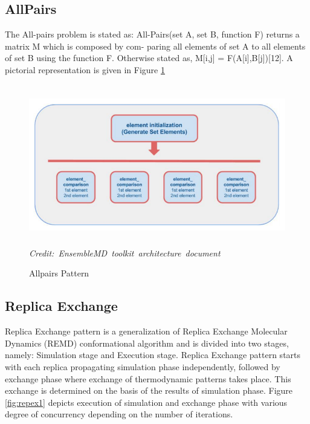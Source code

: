 \documentclass[10pt]{ruthesis}
\begin{document}
\subsection{AllPairs}
The All-pairs problem is stated as:
All-Pairs(set A, set B, function F) returns a matrix M which is composed by com-
paring all elements of set A to all elements of set B using the function F. Otherwise
stated as, M[i,j] = F(A[i],B[j])[12]. A pictorial representation is given in Figure \ref{fig:allpairs}
\begin{figure}
  \centering
  \includegraphics[width=13cm,height=7cm]{allpairs.png}
  \hbox{\small\itshape Credit: EnsembleMD toolkit architecture document \cite{site1}}
  \caption{Allpairs Pattern}
  \label{fig:allpairs}
\end{figure}

\subsection{Replica Exchange}

Replica Exchange pattern is a generalization of Replica Exchange Molecular Dynamics (REMD) conformational algorithm \cite{ref4} and is divided into two stages, namely: Simulation stage and Execution stage. Replica Exchange pattern starts with each replica propagating simulation phase independently, followed by exchange phase where exchange of thermodynamic patterns takes place. This exchange is determined on the basis of the results of simulation phase. Figure \ref{fig:repex1} \cite{site1} depicts execution of simulation and exchange phase with various degree of concurrency depending on the number of iterations.
\end{document}
